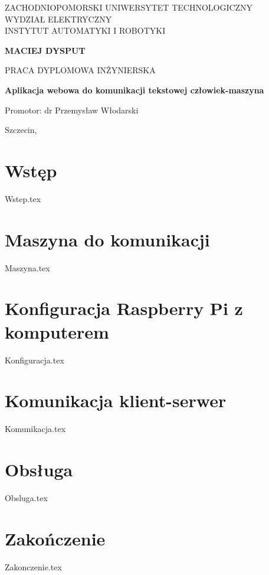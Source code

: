 \documentclass[12pt,a4paper,leqno,oneside,titlepage]{mwrep}
\begin{document}
\begin{titlepage}
\begin{center}

{\large ZACHODNIOPOMORSKI UNIWERSYTET TECHNOLOGICZNY\\ WYDZIAŁ ELEKTRYCZNY\\ INSTYTUT AUTOMATYKI I ROBOTYKI\par}
\end{center}
\vspace{1.5cm plus 1fill}
\begin{center}
{\bf \Large MACIEJ DYSPUT\par}
\end{center}
\vspace{1.5cm plus 1mm minus 2mm}
\begin{center}
{\large PRACA DYPLOMOWA INŻYNIERSKA\par}
\end{center}
\vspace{1.5cm plus 1mm minus 2mm}
\begin{center}
{\huge\textbf{Aplikacja webowa do komunikacji tekstowej człowiek-maszyna}\par}
\vspace{1.5cm plus 1.5fill}
\begin{flushright}
{\large Promotor: dr Przemysław Włodarski}
\end{flushright}
\vspace{4cm plus .1fill}
{\large Szczecin,\par}
\end{center}
\end{titlepage}
\tableofcontents
\chapter{Wstęp}
{Wstep.tex}

\chapter{Maszyna do komunikacji}
{Maszyna.tex}

\chapter{Konfiguracja Raspberry Pi z komputerem}
{Konfiguracja.tex}

\chapter{Komunikacja klient-serwer}
{Komunikacja.tex}


\chapter{Obsługa}
{Obsluga.tex}

\chapter{Zakończenie}
{Zakonczenie.tex}
\end{document}
